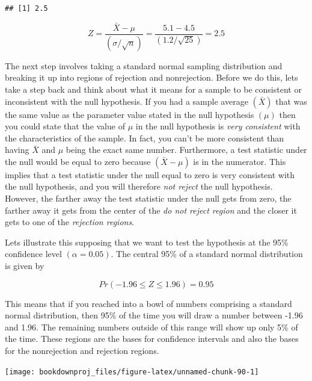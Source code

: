 \documentclass[
]{book}
\begin{document}
\begin{verbatim}
## [1] 2.5
\end{verbatim}

\[ Z = \frac{\bar{X}-\mu}{\left(\sigma / \sqrt{n} \right)} = \frac{5.1-4.5}{\left(1.2 / \sqrt{25} \right)} = 2.5\]

The next step involves taking a standard normal sampling distribution and breaking it up into regions of rejection and nonrejection. Before we do this, lets take a step back and think about what it means for a sample to be consistent or inconsistent with the null hypothesis. If you had a sample average \((\bar{X})\) that was the same value as the parameter value stated in the null hypothesis \((\mu)\) then you could state that the value of \(\mu\) in the null hypothesis is \emph{very consistent} with the characteristics of the sample. In fact, you can't be more consistent than having \(\bar{X}\) and \(\mu\) being the exact same number. Furthermore, a test statistic under the null would be equal to zero because \((\bar{X}-\mu)\) is in the numerator. This implies that a test statistic under the null equal to zero is very consistent with the null hypothesis, and you will therefore \emph{not reject} the null hypothesis. However, the farther away the test statistic under the null gets from zero, the farther away it gets from the center of the \emph{do not reject region} and the closer it gets to one of the \emph{rejection regions}.

Lets illustrate this supposing that we want to test the hypothesis at the 95\% confidence level \((\alpha=0.05)\). The central 95\% of a standard normal distribution is given by

\[Pr(-1.96 \leq Z \leq 1.96) = 0.95\]

This means that if you reached into a bowl of numbers comprising a standard normal distribution, then 95\% of the time you will draw a number between -1.96 and 1.96. The remaining numbers outside of this range will show up only 5\% of the time. These regions are the bases for confidence intervals and also the bases for the nonrejection and rejection regions.

\begin{center}\texttt{[image: bookdownproj\_files/figure-latex/unnamed-chunk-90-1]} \end{center}
\end{document}

